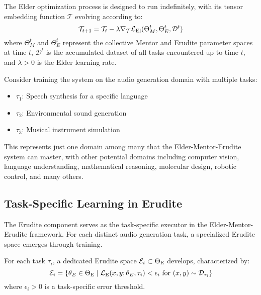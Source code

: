 \begin{proposition}
The Elder optimization process is designed to run indefinitely, with its tensor embedding function $\mathcal{T}$ evolving according to:
\begin{equation}
\mathcal{T}_{t+1} = \mathcal{T}_t - \lambda \nabla_{\mathcal{T}} \mathcal{L}_{\text{El}}(\Theta_M^t, \Theta_E^t, \mathcal{D}^t)
\end{equation}
where $\Theta_M^t$ and $\Theta_E^t$ represent the collective Mentor and Erudite parameter spaces at time $t$, $\mathcal{D}^t$ is the accumulated dataset of all tasks encountered up to time $t$, and $\lambda > 0$ is the Elder learning rate.
\end{proposition}

\begin{example}
Consider training the system on the audio generation domain with multiple tasks:
\begin{itemize}
    \item $\tau_1$: Speech synthesis for a specific language
    \item $\tau_2$: Environmental sound generation
    \item $\tau_3$: Musical instrument simulation
\end{itemize}
This represents just one domain among many that the Elder-Mentor-Erudite system can master, with other potential domains including computer vision, language understanding, mathematical reasoning, molecular design, robotic control, and many others.
\end{example}

\subsection{Task-Specific Learning in Erudite}

The Erudite component serves as the task-specific executor in the Elder-Mentor-Erudite framework. For each distinct audio generation task, a specialized Erudite space emerges through training.

\begin{definition}
For each task $\tau_i$, a dedicated Erudite space $\mathcal{E}_i \subset \Theta_{\text{E}}$ develops, characterized by:
\begin{equation}
\mathcal{E}_i = \{\theta_E \in \Theta_{\text{E}} \mid \mathcal{L}_{\text{E}}(x, y; \theta_E, \tau_i) < \epsilon_i \text{ for } (x,y) \sim \mathcal{D}_{\tau_i}\}
\end{equation}
where $\epsilon_i > 0$ is a task-specific error threshold.
\end{definition}

